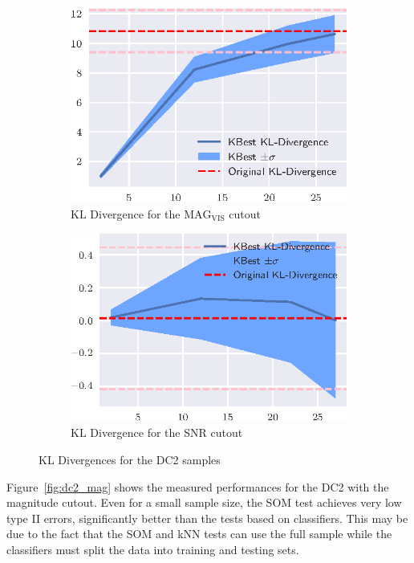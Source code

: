 \begin{figure}[htbp]
    \begin{subfigure}[]{0.5\textwidth}
    \includegraphics[width=\textwidth]{images/4_som/divergence/dc2_mag_divergence.eps}
    \caption{KL Divergence for the $\text{MAG}_\text{VIS}$ cutout}
    \end{subfigure}
    \hfill
    \begin{subfigure}[]{0.5\textwidth}
    \includegraphics[width=\textwidth]{images/4_som/divergence/dc2_snr_divergence.eps}
    \caption{KL Divergence for the SNR cutout}
    \end{subfigure}
    \caption{KL Divergences for the DC2 samples}
    \label{fig:divergence_dc2}
\end{figure}

Figure~\ref{fig:dc2_mag} shows the measured performances for the DC2 with the magnitude
cutout. Even for a small sample size, the \gls{SOM}  test achieves very low type II errors, 
significantly better than the tests based on classifiers.
This may be due to the fact that the \gls{SOM} and kNN
tests can use the full sample while the classifiers must split the data into training and testing sets.


